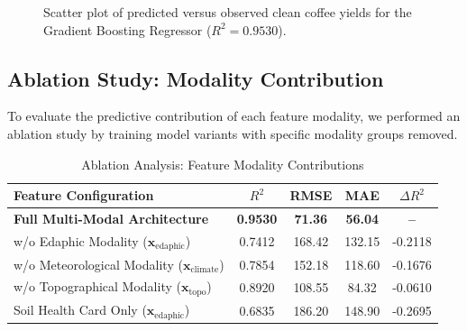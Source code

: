 \documentclass[conference]{IEEEtran}
\begin{document}
\begin{figure}[!t]
\centering
{}
\caption{Scatter plot of predicted versus observed clean coffee yields for the Gradient Boosting Regressor ($R^2 = 0.9530$).}
\label{fig:scatter_plot}
\end{figure}

\subsection{Ablation Study: Modality Contribution}
To evaluate the predictive contribution of each feature modality, we performed an ablation study by training model variants with specific modality groups removed.

\begin{table}[htbp]
\caption{Ablation Analysis: Feature Modality Contributions}
\begin{center}
\begin{tabular}{lcccc}
\toprule
\textbf{Feature Configuration} & \textbf{$R^2$} & \textbf{RMSE} & \textbf{MAE} & \textbf{$\Delta R^2$} \\
\midrule
\textbf{Full Multi-Modal Architecture} & \textbf{0.9530} & \textbf{71.36} & \textbf{56.04} & \textbf{--} \\
w/o Edaphic Modality ($\mathbf{x}_{\text{edaphic}}$) & 0.7412 & 168.42 & 132.15 & -0.2118 \\
w/o Meteorological Modality ($\mathbf{x}_{\text{climate}}$) & 0.7854 & 152.18 & 118.60 & -0.1676 \\
w/o Topographical Modality ($\mathbf{x}_{\text{topo}}$) & 0.8920 & 108.55 & 84.32 & -0.0610 \\
Soil Health Card Only ($\mathbf{x}_{\text{edaphic}}$) & 0.6835 & 186.20 & 148.90 & -0.2695 \\
\bottomrule
\end{tabular}
\label{tab:ablation}
\end{center}
\end{table}
\end{document}
